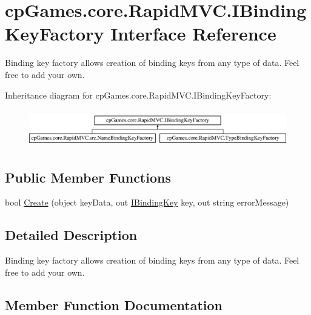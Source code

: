 \hypertarget{interfacecp_games_1_1core_1_1_rapid_m_v_c_1_1_i_binding_key_factory}{}\section{cp\+Games.\+core.\+Rapid\+M\+V\+C.\+I\+Binding\+Key\+Factory Interface Reference}
\label{interfacecp_games_1_1core_1_1_rapid_m_v_c_1_1_i_binding_key_factory}


Binding key factory allows creation of binding keys from any type of data. Feel free to add your own.  


Inheritance diagram for cp\+Games.\+core.\+Rapid\+M\+V\+C.\+I\+Binding\+Key\+Factory\+:\begin{figure}[H]
\begin{center}
\leavevmode
\includegraphics[height=1.681682cm]{interfacecp_games_1_1core_1_1_rapid_m_v_c_1_1_i_binding_key_factory}
\end{center}
\end{figure}
\subsection*{Public Member Functions}
\begin{DoxyCompactItemize}
\item 
bool \mbox{\hyperlink{interfacecp_games_1_1core_1_1_rapid_m_v_c_1_1_i_binding_key_factory_acebadb5b1ee05c449b3872428ce554ff}{Create}} (object key\+Data, out \mbox{\hyperlink{interfacecp_games_1_1core_1_1_rapid_m_v_c_1_1_i_binding_key}{I\+Binding\+Key}} key, out string error\+Message)
\end{DoxyCompactItemize}


\subsection{Detailed Description}
Binding key factory allows creation of binding keys from any type of data. Feel free to add your own. 



\subsection{Member Function Documentation}
\mbox{\label{interfacecp_games_1_1core_1_1_rapid_m_v_c_1_1_i_binding_key_factory_acebadb5b1ee05c449b3872428ce554ff}} 
